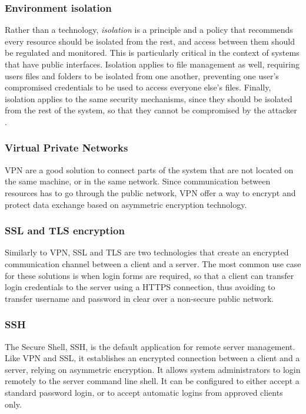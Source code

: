 \subsubsection{Environment isolation}
Rather than a technology, \emph{isolation} is a principle and a policy that
recommends every resource should be isolated from the rest, and access between
them should be regulated and monitored. This is particularly critical in the
context of systems that have public interfaces. Isolation applies to file
management as well, requiring users files and folders to be isolated from one
another, preventing one user's compromised credentials to be used to access
everyone else's files. Finally, isolation applies to the same security
mechanisms, since they should be isolated from the rest of the system, so that
they cannot be compromised by the attacker \cite{WS15}.

\subsubsection{Virtual Private Networks}
VPN are a good solution to connect parts of the system that are not located on
the same machine, or in the same network. Since communication between resources
has to go through the public network, VPN offer a way to encrypt and protect
data exchange based on asymmetric encryption technology.

\subsubsection{SSL and TLS encryption}
Similarly to VPN, SSL and TLS are two technologies that create an encrypted
communication channel between a client and a server. The most common use case
for these solutions is when login forms are required, so that a client can
transfer login credentials to the server using a HTTPS connection, thus avoiding
to transfer username and password in clear over a non-secure public network.

\subsubsection{SSH}
The Secure Shell, SSH, is the default application for remote server management.
Like VPN and SSL, it establishes an encrypted connection between a client and a
server, relying on asymmetric encryption. It allows system administrators to
login remotely to the server command line shell. It can be configured to either
accept a standard password login, or to accept automatic logins from approved
clients only.

